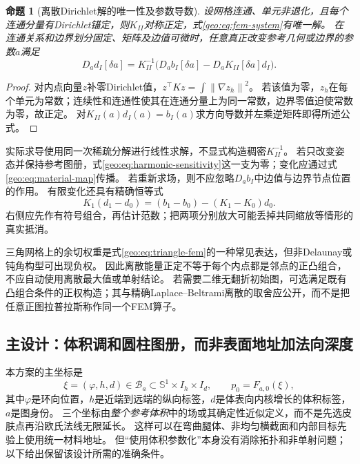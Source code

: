 \documentclass[11pt,a4paper]{article}
\numberwithin{equation}{section}
\newtheorem{proposition}[theorem]{命题}
\theoremstyle{definition}
\newcommand{\norm}[1]{\left\lVert#1\right\rVert}
\begin{document}
\begin{proposition}[离散Dirichlet解的唯一性及参数导数]
\label{geo:prop:fem}
设网格连通、单元非退化，且每个连通分量有Dirichlet锚定，则$K_{II}$对称正定，式\eqref{geo:eq:fem-system}有唯一解。
在连通关系和边界划分固定、矩阵及边值可微时，任意真正改变参考几何或边界的参数$a$满足
\begin{equation}
 D_a d_I[\delta a]
 =K_{II}^{-1}\bigl(D_a b_I[\delta a]
                   -D_aK_{II}[\delta a]d_I\bigr).
 \label{geo:eq:harmonic-sensitivity}
\end{equation}
\end{proposition}
\begin{proof}
对内点向量$z$补零Dirichlet值，$z^{\top}Kz=\int\norm{\nabla z_h}^2$。
若该值为零，$z_h$在每个单元为常数；连续性和连通性使其在连通分量上为同一常数，边界零值迫使常数为零，故正定。
对$K_{II}(a)d_I(a)=b_I(a)$求方向导数并左乘逆矩阵即得所述公式。
\end{proof}

实际求导使用同一次稀疏分解进行线性求解，不显式构造稠密$K_{II}^{-1}$。
若只改变姿态并保持参考图册，式\eqref{geo:eq:harmonic-sensitivity}这一支为零；变化应通过式\eqref{geo:eq:material-map}传播。
若重新求场，则不应忽略$D_ab_I$中边值与边界节点位置的作用。
有限变化还具有精确恒等式
\begin{equation}
 K_1(d_1-d_0)=(b_1-b_0)-(K_1-K_0)d_0.
 \label{geo:eq:harmonic-finite}
\end{equation}
右侧应先作有符号组合，再估计范数；把两项分别放大可能丢掉共同缩放等情形的真实抵消。

三角网格上的余切权重是式\eqref{geo:eq:triangle-fem}的一种常见表达，但非Delaunay或钝角构型可出现负权。
因此离散能量正定不等于每个内点都是邻点的正凸组合，不应自动使用离散最大值或单射结论。
若需要二维无翻折初始图，可选满足既有凸组合条件的正权构造；其与精确Laplace--Beltrami离散的取舍应公开，而不是把任意正图拉普拉斯称作同一个FEM算子。

\subsection{主设计：体积调和圆柱图册，而非表面地址加法向深度}
\label{geo:sub:volume-atlas}

本方案的主坐标是
\begin{equation}
 \xi=(\varphi,h,d)\in\mathcal B_a\subset
       \mathbb S^1\times I_h\times I_d,
 \qquad p_0=F_{a,0}(\xi),
 \label{geo:eq:volume-base}
\end{equation}
其中$\varphi$是环向位置，$h$是近端到远端的纵向标签，$d$是体表向内核增长的体积标签，$a$是图身份。
三个坐标由\emph{整个参考体积}中的场或其确定性近似定义，而不是先选皮肤点再沿欧氏法线无限延长。
这样可以在弯曲腿体、非均匀横截面和内部目标先验上使用统一材料地址。
但“使用体积参数化”本身没有消除拓扑和非单射问题；以下给出保留该设计所需的准确条件。
\end{document}
